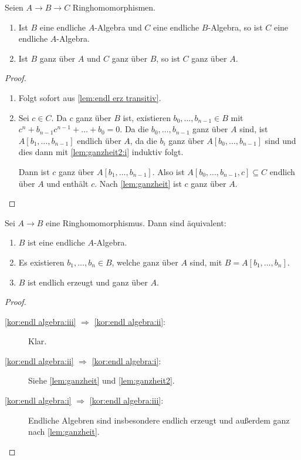 \documentclass[12pt,a4paper]{scrartcl}
\theoremstyle{cplain}
\theoremstyle{cdef}
\begin{document}
\begin{lem} \label{lem:ganzheit2}
	Seien $A\to B\to C$ Ringhomomorphismen.
	\begin{enumerate}
		\item Ist $B$ eine endliche $A$-Algebra und $C$ eine endliche $B$-Algebra, so ist $C$ eine endliche $A$-Algebra. \label{lem:ganzheit2:i}
		\item Ist $B$ ganz über $A$ und $C$ ganz über $B$, so ist $C$ ganz über $A$. \label{lem:ganzheit2:ii}
	\end{enumerate}	
\end{lem}
\begin{proof}
	\leavevmode
	\begin{enumerate}[label=\ref{lem:ganzheit2:\roman*}]
		\item Folgt sofort aus \cref{lem:endl erz transitiv}.
		\item Sei $c\in C$. Da $c$ ganz über $B$ ist, existieren $b_0, \dots, b_{n-1}\in B$ mit $c^n+b_{n-1}c^{n-1}+\dots +b_0 = 0$. Da die $b_0, \dots, b_{n-1}$ ganz über $A$ sind, ist $A[b_1,\dots, b_{n-1}]$ endlich über $A$, da die $b_i$ ganz über $A[b_0,\ldots,b_{n-1}]$ sind und dies dann mit \ref{lem:ganzheit2:i} induktiv folgt.
		
		Dann ist $c$ ganz über $A[b_1,\dots, b_{n-1}]$. Also ist $A[b_0,\dots, b_{n-1}, c]\subseteq C$ endlich über $A$ und enthält $c$. Nach \cref{lem:ganzheit} ist $c$ ganz über $A$.
		\qedhere
	\end{enumerate}
\end{proof}

\begin{kor} \label{kor:endl algebra}
	Sei $A\to B$ eine Ringhomomorphismus. Dann sind äquivalent:
	\begin{enumerate}
		\item $B$ ist eine endliche $A$-Algebra. \label{kor:endl algebra:i}
		\item Es existieren $b_1,\dots, b_n\in B$, welche ganz über $A$ sind, mit $B = A[b_1,\dots, b_n]$. \label{kor:endl algebra:ii}
		\item $B$ ist endlich erzeugt und ganz über $A$. \label{kor:endl algebra:iii}
	\end{enumerate}
\end{kor}
\begin{proof}
	\leavevmode
	\begin{description}
		\item[\ref{kor:endl algebra:iii} $\Rightarrow$ \ref{kor:endl algebra:ii}:] Klar.
		\item[\ref{kor:endl algebra:ii} $\Rightarrow$ \ref{kor:endl algebra:i}:] Siehe \cref{lem:ganzheit} und \cref{lem:ganzheit2}.
		\item[\ref{kor:endl algebra:i} $\Rightarrow$ \ref{kor:endl algebra:iii}:] Endliche Algebren sind insbesondere endlich erzeugt und außerdem ganz nach \cref{lem:ganzheit}.
		\qedhere
	\end{description}
\end{proof}
\end{document}

